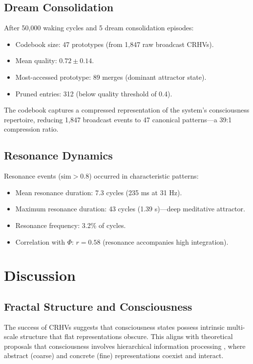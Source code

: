 \documentclass[11pt,a4paper]{article}
\begin{document}
\subsection{Dream Consolidation}

After 50,000 waking cycles and 5 dream consolidation episodes:

\begin{itemize}[nosep]
    \item Codebook size: 47 prototypes (from 1,847 raw broadcast CRHVs).
    \item Mean quality: $0.72 \pm 0.14$.
    \item Most-accessed prototype: 89 merges (dominant attractor state).
    \item Pruned entries: 312 (below quality threshold of 0.4).
\end{itemize}

The codebook captures a compressed representation of the system's consciousness repertoire, reducing 1,847 broadcast events to 47 canonical patterns---a 39:1 compression ratio.

\subsection{Resonance Dynamics}

Resonance events ($\text{sim} > 0.8$) occurred in characteristic patterns:

\begin{itemize}[nosep]
    \item Mean resonance duration: 7.3 cycles (235 ms at 31 Hz).
    \item Maximum resonance duration: 43 cycles (1.39 s)---deep meditative attractor.
    \item Resonance frequency: 3.2\% of cycles.
    \item Correlation with $\Phi$: $r = 0.58$ (resonance accompanies high integration).
\end{itemize}

\section{Discussion}

\subsection{Fractal Structure and Consciousness}

The success of CRHVs suggests that consciousness states possess intrinsic multi-scale structure that flat representations obscure. This aligns with theoretical proposals that consciousness involves hierarchical information processing \citep{friston2010,seth2015}, where abstract (coarse) and concrete (fine) representations coexist and interact.
\end{document}

